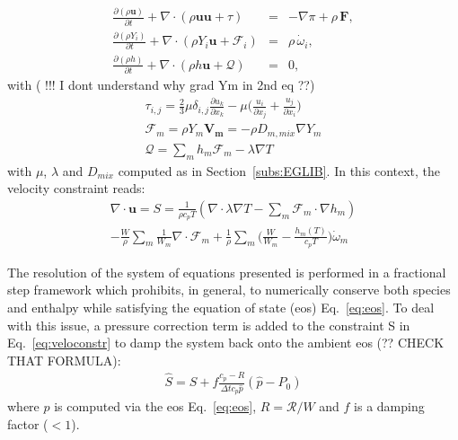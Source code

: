 \begin{eqnarray}
\frac{\partial (\rho \boldsymbol{u})}{\partial t} + 
\nabla \cdot \left(\rho  \boldsymbol{u} \boldsymbol{u} + \tau \right)
&=& -\nabla \pi + \rho \, \boldsymbol{F}  ,
\label{eq:mom}
\\
\frac{\partial (\rho Y_i)}{\partial t} +
\nabla \cdot \left( \rho Y_i \boldsymbol{u} + \boldsymbol{\mathcal{F}}_{i} \right)
&=& \rho \, \dot{\omega}_i,
\label{eq:species}
\\
\frac{ \partial (\rho h)}{ \partial t} +
\nabla \cdot \left( \rho h \boldsymbol{u} + \boldsymbol{\mathcal{Q}} \right) &=& 0 ,
\label{eq:enthalpy}
\end{eqnarray}
with ( !!! I dont understand why grad Ym in 2nd eq ??)
 \begin{eqnarray}
\tau_{i,j} = \frac{2}{3} \mu \delta_{i,j} \frac{\partial {u_k}}{\partial x_k} - \mu \Big(\frac{u_i}{\partial x_j} + \frac{u_j}{\partial x_i}\Big)
\\
\boldsymbol{\mathcal{F}}_{m} = \rho Y_m \boldsymbol{V_m} = - \rho D_{m,mix} \nabla Y_m
\\
\boldsymbol{\mathcal{Q}} =  \sum_m h_m \boldsymbol{\mathcal{F}}_{m}  - \lambda \nabla T
\end{eqnarray}
with $\mu$, $\lambda$ and $D_{mix}$ computed as in Section~\ref{subs:EGLIB}. In this context, the velocity constraint reads:
\begin{eqnarray}
\nabla \cdot \boldsymbol{u} = S= \frac{1}{\rho c_p T}(\nabla \cdot \lambda \nabla T - \sum_m  \boldsymbol{\mathcal{F}}_{m} \cdot \nabla h_m)
\\
- \frac{W}{\rho} \sum_m \frac{1}{W_m} \nabla \cdot \boldsymbol{\mathcal{F}}_{m} + \frac{1}{\rho} \sum_m \Big( \frac{W}{W_m} -\frac{h_m(T)}{c_p T} \Big)\dot{\omega}_m
\end{eqnarray}



The resolution of the system of equations presented is performed in a fractional step framework which prohibits, in general, to numerically conserve both species and enthalpy while satisfying the equation of state (eos) Eq.~\ref{eq:eos}. To deal with this issue, a pressure correction term is added to the constraint S in Eq.~\ref{eq:veloconstr} to damp the system back onto the ambient eos (?? CHECK THAT FORMULA):
\begin{eqnarray}
\hat{S} = S + f \frac{c_p - R}{\Delta t c_p \hat{p}} (\hat{p} - P_0)
\end{eqnarray}
where $\hat{p}$ is computed via the eos Eq.~\ref{eq:eos}, $R = \mathcal{R}/W$ and $f$ is a damping factor ($<1$).

